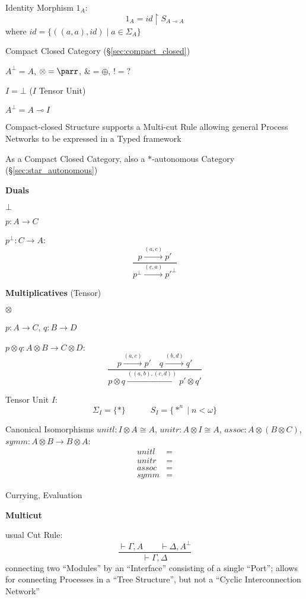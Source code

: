 Identity Morphism $1_A$:
\[
  1_A = id \upharpoonright S_{A \multimap A}
\]
where $id = \{((a,a),id) \mid a \in \Sigma_A\}$


\asterism


Compact Closed Category (\S\ref{sec:compact_closed})

$A^\bot = A$, $\otimes = \parr$, $\& = \oplus$, $! = ?$

$I = \bot$ ($I$ Tensor Unit)

$A^\bot = A \multimap I$

Compact-closed Structure supports a Multi-cut Rule allowing general
Process Networks to be expressed in a Typed framework

As a Compact Closed Category, also a $*$-autonomous Category
(\S\ref{sec:star_autonomous})


\textbf{Duals}

$\bot$

$p : A \rightarrow C$

$p^\bot : C \rightarrow A$:
\[
  \frac{p \xrightarrow{(a,c)} p'}
  {p^\bot \xrightarrow{(c,a)} p'^\bot}
\]


\textbf{Multiplicatives} (Tensor)

$\otimes$

$p : A \rightarrow C$, $q : B \rightarrow D$

$p \otimes q : A \otimes B \rightarrow C \otimes D$:
\[
  \frac{p \xrightarrow{(a,c)} p' \quad q \xrightarrow{(b,d)} q'}
  {p\otimes q \xrightarrow{((a,b),(c,d))} p' \otimes q'}
\]

Tensor Unit $I$:
\[
  \Sigma_I = \{*\} \quad\quad\quad S_I = \{*^n \mid n < \omega \}
\]

Canonical Isomorphisms $unitl : I \otimes A \cong A$, $unitr : A
\otimes I \cong A$, $assoc : A \otimes (B \otimes C)$, $symm : A
\otimes B \rightarrow B \otimes A$:
\begin{align*}
  unitl &= \\
  unitr &= \\
  assoc &= \\
  symm &=
\end{align*}

Currying, Evaluation


\textbf{Multicut}

usual Cut Rule:
\[
  \frac{\vdash\Gamma,A \quad\quad \vdash\Delta,A^\bot}
  {\vdash\Gamma,\Delta}
\]
connecting two ``Modules'' by an ``Interface'' consisting of a single
``Port''; allows for connecting Processes in a ``Tree Structure'', but
not a ``Cyclic Interconnection Network''

